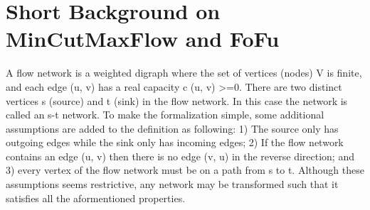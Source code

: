 \documentclass{llncs}
\begin{document}
\section{Short Background on MinCutMaxFlow and FoFu}
%       
%   
% 
%         
%   
%   
%   
%   
%   
A flow network is a weighted digraph where the set of vertices (nodes) V is finite, and each edge (u, v) has a real capacity c (u, v) >=0. There are two distinct vertices s (source) and t (sink) in the flow network. In this case the network is called an s-t network. To make the formalization simple, some additional assumptions are added to the definition as following: 1) The source only has outgoing edges while the sink only has incoming edges; 2) If the flow network contains an edge (u, v) then there is no edge (v, u) in the reverse direction; and 3) every vertex of the flow network must be on a path from s to t. Although these assumptions seems restrictive, any network may be transformed such that it satisfies all the aformentioned properties.
\end{document}
